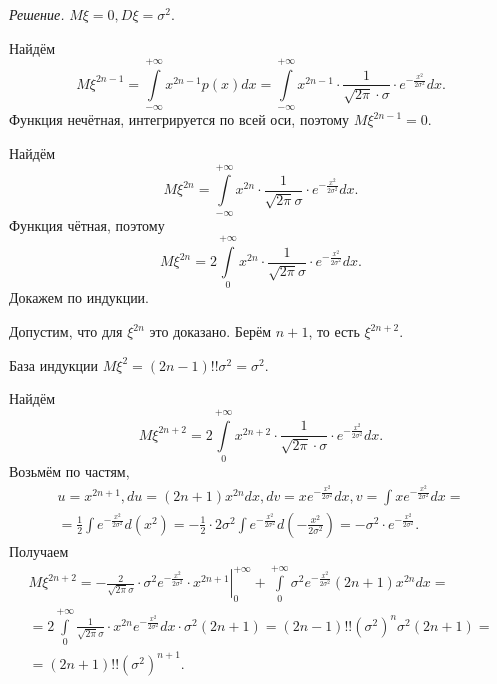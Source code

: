 \textit{Решение.} $M \xi = 0, D \xi = \sigma^2$.

Найдём
$$M \xi^{2n-1} =
\int \limits_{- \infty }^{+ \infty } x^{2n-1} p \left( x \right) dx =
\int \limits_{- \infty }^{+ \infty } x^{2n-1} \cdot \frac{1}{ \sqrt{2 \pi } \cdot \sigma } \cdot e^{- \frac{x^2}{2 \sigma^2}}dx.$$
Функция нечётная, интегрируется по всей оси, поэтому $M \xi^{2n-1} = 0$.

Найдём
$$M \xi^{2n} =
\int \limits_{- \infty }^{+ \infty } x^{2n} \cdot \frac{1}{ \sqrt{2 \pi } \sigma } \cdot e^{- \frac{x^2}{2 \sigma^2}} dx.$$
Функция чётная, поэтому
$$M \xi^{2n} =
2 \int \limits_0^{+ \infty } x^{2n} \cdot \frac{1}{ \sqrt{2 \pi } \sigma } \cdot e^{- \frac{x^2}{2 \sigma^2}} dx.$$
Докажем по индукции.

Допустим, что для $ \xi^{2n}$ это доказано.
Берём $n+1$, то есть $ \xi^{2n+2}$.

База индукции $M \xi^2 = \left( 2n-1 \right)!! \sigma^2 = \sigma^2$.

Найдём
$$M \xi^{2n+2} =
2 \int \limits_0^{+ \infty } x^{2n+2} \cdot \frac{1}{ \sqrt{2 \pi} \cdot \sigma } \cdot e^{- \frac{x^2}{2 \sigma^2}} dx.$$
Возьмём по частям,
\begin{equation*}
\begin{split}
u = x^{2n+1},
du = \left( 2n+1 \right) x^{2n}dx,
dv = xe^{- \frac{x^2}{2 \sigma^2}} dx,
v = \int xe^{- \frac{x^2}{2 \sigma^2}} dx = \\
= \frac{1}{2} \int e^{- \frac{x^2}{2 \sigma^2}} d \left( x^2 \right) =
- \frac{1}{2} \cdot 2 \sigma^2 \int e^{- \frac{x^2}{2 \sigma^2}} d \left( - \frac{x^2}{2 \sigma^2} \right) =
- \sigma^2 \cdot e^{- \frac{x^2}{2 \sigma^2}}.
\end{split}
\end{equation*}
Получаем
\begin{equation*}
\begin{split}
M \xi^{2n+2} =
\left. - \frac{2}{ \sqrt{2 \pi } \sigma } \cdot \sigma^2 e^{- \frac{x^2}{2 \sigma^2}} \cdot x^{2n+1} \right|_0^{+ \infty } +
\int \limits_0^{+ \infty } \sigma^2 e^{- \frac{x^2}{2 \sigma^2}} \left( 2n+1 \right) x^{2n} dx = \\
= 2 \int \limits_0^{+ \infty } \frac{1}{ \sqrt{2 \pi } \sigma } \cdot x^{2n} e^{- \frac{x^2}{2 \sigma^2}} dx \cdot \sigma^2 \left( 2n+1 \right) =
\left( 2n-1 \right)!! \left( \sigma^2 \right)^n \sigma^2 \left( 2n+1 \right) = \\
= \left( 2n+1 \right)!! \left( \sigma^2 \right)^{n+1}.
\end{split}
\end{equation*}

